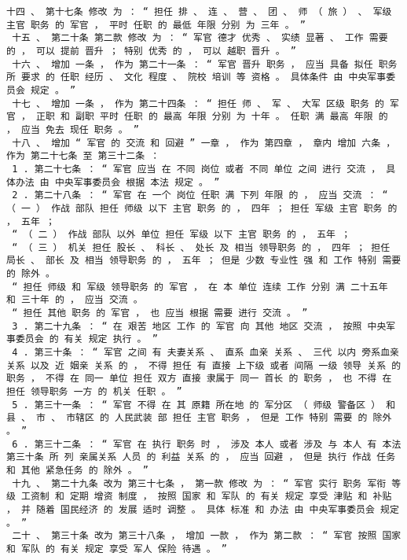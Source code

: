 \documentclass{article}
\begin{document}
\begin{Verbatim}[commandchars=\\\{\}]
 十四 、 第十七条 修改 为 ： “ 担任 排 、 连 、 营 、 团 、 师 （ 旅 ） 、 军级 主官 职务 的 军官 ， 平时 任职 的 最低 年限 分别 为 三年 。 ” 
 十五 、 第二十条 第二款 修改 为 ： “ 军官 德才 优秀 、 实绩 显著 、 工作 需要 的 ， 可以 提前 晋升 ； 特别 优秀 的 ， 可以 越职 晋升 。 ” 
 十六 、 增加 一条 ， 作为 第二十一条 ： “ 军官 晋升 职务 ， 应当 具备 拟任 职务 所 要求 的 任职 经历 、 文化 程度 、 院校 培训 等 资格 。 具体条件 由 中央军事委员会 规定 。 ” 
 十七 、 增加 一条 ， 作为 第二十四条 ： “ 担任 师 、 军 、 大军 区级 职务 的 军官 ， 正职 和 副职 平时 任职 的 最高 年限 分别 为 十年 。 任职 满 最高 年限 的 ， 应当 免去 现任 职务 。 ” 
 十八 、 增加 “ 军官 的 交流 和 回避 ” 一章 ， 作为 第四章 ， 章内 增加 六条 ， 作为 第二十七条 至 第三十二条 ： 
 1 . 第二十七条 ： “ 军官 应当 在 不同 岗位 或者 不同 单位 之间 进行 交流 ， 具体办法 由 中央军事委员会 根据 本法 规定 。 ” 
 2 . 第二十八条 ： “ 军官 在 一个 岗位 任职 满 下列 年限 的 ， 应当 交流 ： “ （ 一 ） 作战 部队 担任 师级 以下 主官 职务 的 ， 四年 ； 担任 军级 主官 职务 的 ， 五年 ； 
 “ （ 二 ） 作战 部队 以外 单位 担任 军级 以下 主官 职务 的 ， 五年 ； 
 “ （ 三 ） 机关 担任 股长 、 科长 、 处长 及 相当 领导职务 的 ， 四年 ； 担任 局长 、 部长 及 相当 领导职务 的 ， 五年 ； 但是 少数 专业性 强 和 工作 特别 需要 的 除外 。 
 “ 担任 师级 和 军级 领导职务 的 军官 ， 在 本 单位 连续 工作 分别 满 二十五年 和 三十年 的 ， 应当 交流 。 
 “ 担任 其他 职务 的 军官 ， 也 应当 根据 需要 进行 交流 。 ” 
 3 . 第二十九条 ： “ 在 艰苦 地区 工作 的 军官 向 其他 地区 交流 ， 按照 中央军事委员会 的 有关 规定 执行 。 ” 
 4 . 第三十条 ： “ 军官 之间 有 夫妻关系 、 直系 血亲 关系 、 三代 以内 旁系血亲 关系 以及 近 姻亲 关系 的 ， 不得 担任 有 直接 上下级 或者 间隔 一级 领导 关系 的 职务 ， 不得 在 同一 单位 担任 双方 直接 隶属于 同一 首长 的 职务 ， 也 不得 在 担任 领导职务 一方 的 机关 任职 。 ” 
 5 . 第三十一条 ： “ 军官 不得 在 其 原籍 所在地 的 军分区 （ 师级 警备区 ） 和县 、 市 、 市辖区 的 人民武装 部 担任 主官 职务 ， 但是 工作 特别 需要 的 除外 。 ” 
 6 . 第三十二条 ： “ 军官 在 执行 职务 时 ， 涉及 本人 或者 涉及 与 本人 有 本法 第三十条 所 列 亲属关系 人员 的 利益 关系 的 ， 应当 回避 ， 但是 执行 作战 任务 和 其他 紧急任务 的 除外 。 ” 
 十九 、 第二十九条 改为 第三十七条 ， 第一款 修改 为 ： “ 军官 实行 职务 军衔 等级 工资制 和 定期 增资 制度 ， 按照 国家 和 军队 的 有关 规定 享受 津贴 和 补贴 ， 并 随着 国民经济 的 发展 适时 调整 。 具体 标准 和 办法 由 中央军事委员会 规定 。 ” 
 二十 、 第三十条 改为 第三十八条 ， 增加 一款 ， 作为 第二款 ： “ 军官 按照 国家 和 军队 的 有关 规定 享受 军人 保险 待遇 。 ” 

\end{Verbatim}
\end{document}

